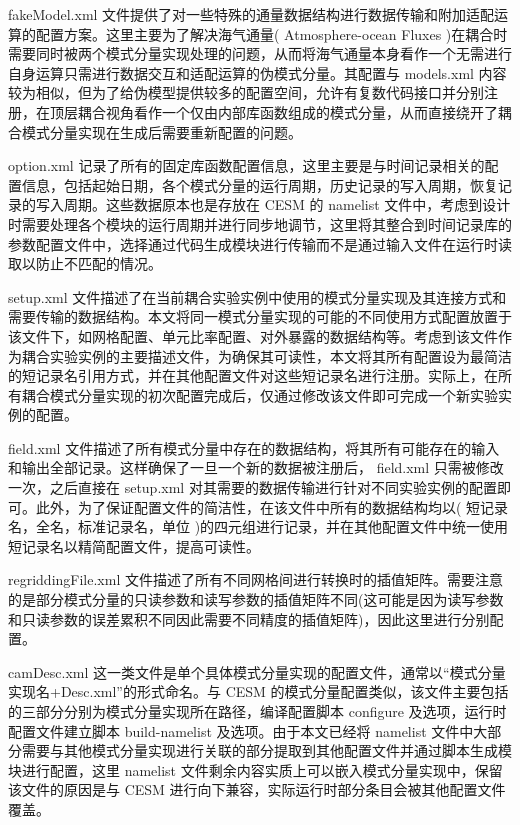 fakeModel.xml 文件提供了对一些特殊的通量数据结构进行数据传输和附加适配运算的配置方案。这里主要为了解决海气通量( Atmosphere-ocean Fluxes )在耦合时需要同时被两个模式分量实现处理的问题，从而将海气通量本身看作一个无需进行自身运算只需进行数据交互和适配运算的伪模式分量。其配置与 models.xml 内容较为相似，但为了给伪模型提供较多的配置空间，允许有复数代码接口并分别注册，在顶层耦合视角看作一个仅由内部库函数组成的模式分量，从而直接绕开了耦合模式分量实现在生成后需要重新配置的问题。

option.xml 记录了所有的固定库函数配置信息，这里主要是与时间记录相关的配置信息，包括起始日期，各个模式分量的运行周期，历史记录的写入周期，恢复记录的写入周期。这些数据原本也是存放在 CESM 的 namelist 文件中，考虑到设计时需要处理各个模块的运行周期并进行同步地调节，这里将其整合到时间记录库的参数配置文件中，选择通过代码生成模块进行传输而不是通过输入文件在运行时读取以防止不匹配的情况。

setup.xml 文件描述了在当前耦合实验实例中使用的模式分量实现及其连接方式和需要传输的数据结构。本文将同一模式分量实现的可能的不同使用方式配置放置于该文件下，如网格配置、单元比率配置、对外暴露的数据结构等。考虑到该文件作为耦合实验实例的主要描述文件，为确保其可读性，本文将其所有配置设为最简洁的短记录名引用方式，并在其他配置文件对这些短记录名进行注册。实际上，在所有耦合模式分量实现的初次配置完成后，仅通过修改该文件即可完成一个新实验实例的配置。

field.xml 文件描述了所有模式分量中存在的数据结构，将其所有可能存在的输入和输出全部记录。这样确保了一旦一个新的数据被注册后， field.xml 只需被修改一次，之后直接在 setup.xml 对其需要的数据传输进行针对不同实验实例的配置即可。此外，为了保证配置文件的简洁性，在该文件中所有的数据结构均以( 短记录名，全名，标准记录名，单位 )的四元组进行记录，并在其他配置文件中统一使用短记录名以精简配置文件，提高可读性。

regriddingFile.xml 文件描述了所有不同网格间进行转换时的插值矩阵。需要注意的是部分模式分量的只读参数和读写参数的插值矩阵不同(这可能是因为读写参数和只读参数的误差累积不同因此需要不同精度的插值矩阵)，因此这里进行分别配置。

camDesc.xml 这一类文件是单个具体模式分量实现的配置文件，通常以“模式分量实现名+Desc.xml”的形式命名。与 CESM 的模式分量配置类似，该文件主要包括的三部分分别为模式分量实现所在路径，编译配置脚本 configure 及选项，运行时配置文件建立脚本 build-namelist 及选项。由于本文已经将 namelist 文件中大部分需要与其他模式分量实现进行关联的部分提取到其他配置文件并通过脚本生成模块进行配置，这里 namelist 文件剩余内容实质上可以嵌入模式分量实现中，保留该文件的原因是与 CESM 进行向下兼容，实际运行时部分条目会被其他配置文件覆盖。

